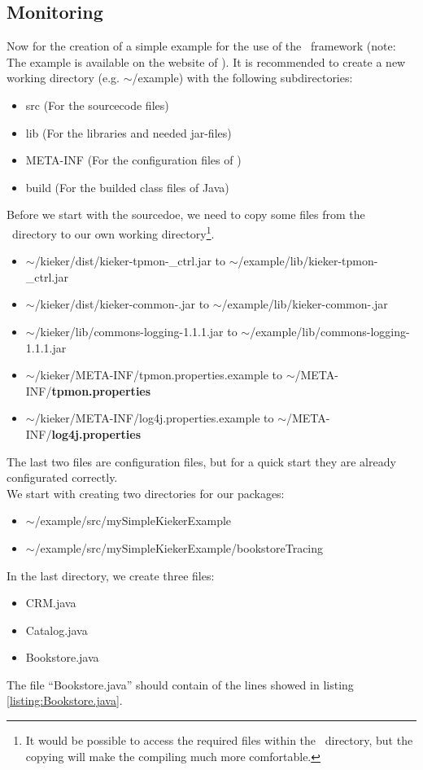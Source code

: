 \documentclass[a4paper, oneside, 11pt]{scrartcl}
\begin{document}
\subsection{Monitoring}
Now for the creation of a simple example for the use of the \Kieker\ framework (note: The example is available on the website of \Kieker). It is recommended to create a new working directory (e.g. $\sim$/example) with the following subdirectories:
\begin{itemize}
  \item src (For the sourcecode files)
  \item lib (For the libraries and needed jar-files)
  \item META-INF (For the configuration files of \Kieker)
  \item build (For the builded class files of Java)
\end{itemize}
Before we start with the sourcedoe, we need to copy some files from the \Kieker\ directory to our own working directory\footnote{It would be possible to access the required files within the \Kieker\ directory, but the copying will make the compiling much more comfortable.}.
\begin{itemize}
  \item $\sim$/kieker/dist/kieker-tpmon-\version\_ctrl.jar to $\sim$/example/lib/kieker-tpmon-\version\_ctrl.jar
  \item $\sim$/kieker/dist/kieker-common-\version.jar to $\sim$/example/lib/kieker-common-\version.jar
  \item $\sim$/kieker/lib/commons-logging-1.1.1.jar to $\sim$/example/lib/commons-logging-1.1.1.jar
  \item $\sim$/kieker/META-INF/tpmon.properties.example to $\sim$/META-INF/\textbf{tpmon.properties}
  \item $\sim$/kieker/META-INF/log4j.properties.example to $\sim$/META-INF/\textbf{log4j.properties}
\end{itemize}
The last two files are configuration files, but for a quick start they are already configurated correctly.\\

We start with creating two directories for our packages:
\begin{itemize}
  \item $\sim$/example/src/mySimpleKiekerExample
  \item $\sim$/example/src/mySimpleKiekerExample/bookstoreTracing
\end{itemize}
In the last directory, we create three files: 
\begin{itemize}
  \item CRM.java
  \item Catalog.java
  \item Bookstore.java
\end{itemize}
The file ``Bookstore.java'' should contain of the lines showed in listing \ref{listing:Bookstore.java}.
\end{document}
